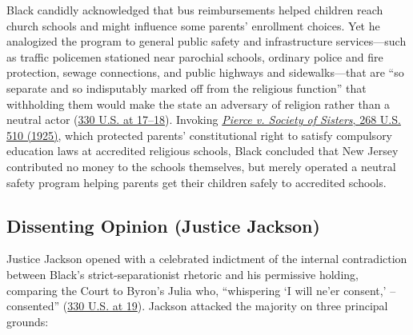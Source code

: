 \documentclass[12pt]{article}
\begin{document}
Black candidly acknowledged that bus reimbursements helped children reach church schools and might influence some parents' enrollment choices. Yet he analogized the program to general public safety and infrastructure services---such as traffic policemen stationed near parochial schools, ordinary police and fire protection, sewage connections, and public highways and sidewalks---that are ``so separate and so indisputably marked off from the religious function'' that withholding them would make the state an adversary of religion rather than a neutral actor (\href{https://supreme.justia.com/cases/federal/us/330/1/}{330 U.S. at 17--18}). Invoking \href{https://supreme.justia.com/cases/federal/us/268/510/}{\emph{Pierce v. Society of Sisters}, 268 U.S. 510 (1925)}, which protected parents' constitutional right to satisfy compulsory education laws at accredited religious schools, Black concluded that New Jersey contributed no money to the schools themselves, but merely operated a neutral safety program helping parents get their children safely to accredited schools.

\subsection{Dissenting Opinion (Justice Jackson)}

Justice Jackson opened with a celebrated indictment of the internal contradiction between Black's strict-separationist rhetoric and his permissive holding, comparing the Court to Byron's Julia who, ``whispering `I will ne'er consent,' -- consented'' (\href{https://supreme.justia.com/cases/federal/us/330/1/}{330 U.S. at 19}). Jackson attacked the majority on three principal grounds:
\end{document}
